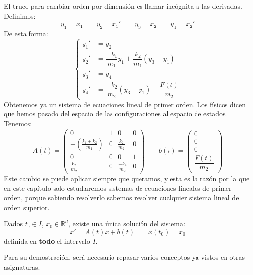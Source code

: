 \begin{ejemplo}
    \noindent
    El truco para cambiar orden por dimensión es llamar incógnita a las derivadas. Definimos:
    \begin{equation*}
        y_1 = x_1 \qquad y_2 = x_1' \qquad y_3 = x_2 \qquad y_4 = x_2'
    \end{equation*}
    De esta forma:
    \begin{equation*}
        \left\{\begin{array}{rl}
                y_1' &= y_2 \\
            y_2' &= \dfrac{-k_1}{m_1} y_1 + \dfrac{k_2}{m_1} (y_3-y_1) \\
            y_3' &= y_4 \\
            y_4' &= \dfrac{-k_2}{m_2}(y_3-y_1) + \dfrac{F(t)}{m_2}
        \end{array}\right.
    \end{equation*}
    Obtenemos ya un sistema de ecuaciones lineal de primer orden. Los físicos dicen que hemos pasado del espacio de las configuraciones al espacio de estados.\\

    Tenemos:
    \begin{equation*}
        A(t) = \left(\begin{array}{cccc}
                0 & 1 & 0 & 0 \\
                -\left(\frac{k_1+k_2}{m_1}\right) & 0 & \frac{k_2}{m_2} & 0 \\
                0 & 0 & 0 & 1 \\
                \frac{k_2}{m_2} & 0 & \frac{-k_2}{m_2} & 0
        \end{array}\right) \qquad b(t) = \left(\begin{array}{c}
            0 \\
            0 \\
            0 \\
            \dfrac{F(t)}{m_2}
        \end{array}\right)
    \end{equation*}
    Este cambio se puede aplicar siempre que queramos, y esta es la razón por la que en este capítulo solo estudiaremos sistemas de ecuaciones lineales de primer orden, porque sabiendo resolverlo sabemos resolver cualquier sistema lineal de orden superior.
\end{ejemplo}

\begin{teo}\label{teo:existencia_unicidad_sistemas}
    Dados $t_0\in I$, $x_0\in \mathbb{R}^d$, existe una única solución del sistema:
    \begin{equation*}
        x' = A(t)x + b(t) \qquad x(t_0) = x_0
    \end{equation*}
    definida en \textbf{todo} el intervalo $I$.
\end{teo}
\noindent
Para su demostración, será necesario repasar varios conceptos ya vistos en otras asignaturas.

